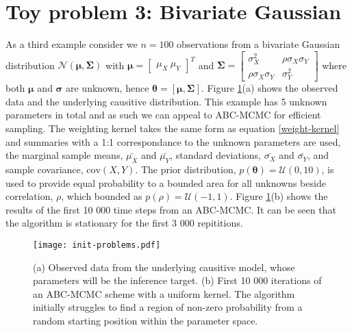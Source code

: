 \section{Toy problem 3: Bivariate Gaussian}
As a third example consider we $n = 100$ observations from a bivariate Gaussian distribution $\mathcal{N}(\bm{\mu},\bm{\Sigma})$ with $\bm{\mu} = \begin{bmatrix}
\mu_X\ \mu_Y
\end{bmatrix}^T$ and $\bm{\Sigma} = \begin{bmatrix}
\sigma^2_X & \rho\sigma_X\sigma_Y\\
\rho\sigma_X\sigma_Y & \sigma^2_Y
\end{bmatrix} $ where both $\bm{\mu}$ and $\bm{\sigma}$ are unknown, hence $\bm{\theta} = [\bm{\mu},\bm{\Sigma}]$. Figure \ref{init-qualms}(a) shows the observed data and the underlying causitive distribution. This example has 5 unknown parameters in total and as such we can appeal to ABC-MCMC for efficient sampling. The weighting kernel takes the same form as equation \ref{weight-kernel} and summaries with a 1:1 correspondance to the unknown parameters are used, the marginal sample means, $\bar{\mu_X}$ and $\bar{\mu_Y}$, standard deviations, $\bar{\sigma_X}$ and $\bar{\sigma_Y}$, and sample covariance, $\text{cov}(X,Y)$. The prior distribution, $p(\bm{\theta}) = \mathcal{U}(0,10)$, is used to provide equal probability to a bounded area for all unknowns beside correlation, $\rho$, which bounded as $p(\rho) = \mathcal{U}(-1,1)$. Figure \ref{init-qualms}(b) shows the results of the first 10 000 time steps from an ABC-MCMC. It can be seen that the algorithm is stationary for the first 3 000 repititions.\\

\begin{figure}[H]
	\centering
	\texttt{[image: init-problems.pdf]}
	\caption{(a) Observed data from the underlying causitive model, whose parameters will be the inference target. (b) First 10 000 iterations of an ABC-MCMC scheme with a uniform kernel. The algorithm initially struggles to find a region of non-zero probability from a random starting position within the parameter space.}
	\label{init-qualms}
\end{figure}


